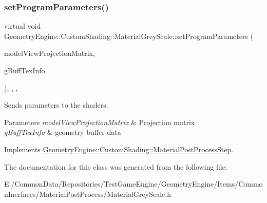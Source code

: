 \mbox{\label{class_geometry_engine_1_1_custom_shading_1_1_material_grey_scale_add050c593a0f3a515b4b149439e983bb}} 
\subsubsection{\texorpdfstring{setProgramParameters()}{setProgramParameters()}}
{\footnotesize\ttfamily virtual void Geometry\+Engine\+::\+Custom\+Shading\+::\+Material\+Grey\+Scale\+::set\+Program\+Parameters (\begin{DoxyParamCaption}\item[{const Q\+Matrix4x4 \&}]{model\+View\+Projection\+Matrix,  }\item[{const \mbox{\hyperlink{class_geometry_engine_1_1_g_buffer_texture_info}{G\+Buffer\+Texture\+Info}} \&}]{g\+Buff\+Tex\+Info }\end{DoxyParamCaption})\hspace{0.3cm}{\ttfamily [inline]}, {\ttfamily [override]}, {\ttfamily [protected]}, {\ttfamily [virtual]}}

Sends parameters to the shaders. 
\begin{DoxyParams}{Parameters}
{\em model\+View\+Projection\+Matrix} & Projection matrix \\
\hline
{\em g\+Buff\+Tex\+Info} & geometry buffer data \\
\hline
\end{DoxyParams}


Implements \mbox{\hyperlink{class_geometry_engine_1_1_custom_shading_1_1_material_post_process_step_ac4b9fa8b3d4fb80b82a9bd43add77f1e}{Geometry\+Engine\+::\+Custom\+Shading\+::\+Material\+Post\+Process\+Step}}.



The documentation for this class was generated from the following file\+:\begin{DoxyCompactItemize}
\item 
E\+:/\+Common\+Data/\+Repositories/\+Test\+Game\+Engine/\+Geometry\+Engine/\+Items/\+Common\+Inerfaces/\+Material\+Post\+Process/Material\+Grey\+Scale.\+h\end{DoxyCompactItemize}
